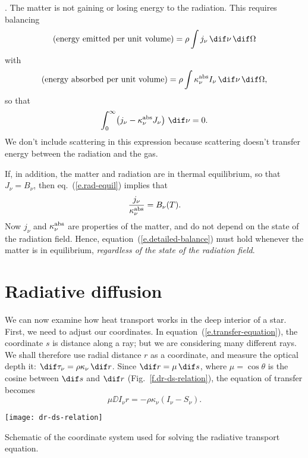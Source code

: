 . 
The matter is not gaining or losing energy to the radiation. This requires balancing
\[ \left(\textrm{energy emitted per unit volume}\right) = \rho\int j_{\nu}\,\dif\nu\,\dif\Omega\] 
with
\[ \left(\textrm{energy absorbed per unit volume}\right) = \rho\int \kapabs I_{\nu}\,\dif\nu\,\dif\Omega,\]
so that
\begin{equation}\label{e.rad-equil}
\int_{0}^{\infty}\! \left(j_{\nu} - \kapabs J_{\nu}\right)\,\dif\nu = 0.
\end{equation}
We don't include scattering in this expression because scattering doesn't transfer energy between the radiation and the gas.

If, in addition, the matter and radiation are in thermal equilibrium, so that $J_{\nu} = B_{\nu}$, then eq.~(\ref{e.rad-equil}) implies that
\begin{equation}\label{e.detailed-balance}
\frac{j_{\nu}}{\kappa_\nu^{\mathrm{abs}}} = B_{\nu}(T).
\end{equation}
Now $j_{\nu}$ and $\kappa_\nu^{\mathrm{abs}}$ are properties of the matter, and do not depend on the state of the radiation field. Hence, equation~(\ref{e.detailed-balance}) must hold whenever the matter is in equilibrium, \emph{regardless of the state of the radiation field}.

\section{Radiative diffusion}

We can now examine how heat transport works in the deep interior of a star. First, we need to adjust our coordinates. In equation~(\ref{e.transfer-equation}), the coordinate $s$ is distance along a ray; but we are considering many different rays. We shall therefore use radial distance $r$ as a coordinate, and measure the optical depth it: $\dif\tau_{\nu} = \rho\kappa_{\nu}\,\dif r$. 
Since $\dif r = \mu\,\dif s$, where $\mu=\cos\theta$ is the cosine between $\dif s$ and $\dif r$ (Fig.~\ref{f.dr-ds-relation}), the equation of transfer becomes
\begin{equation}
\mu\DD{I_{\nu}}{r} = -\rho\kappa_{\nu}\left(I_{\nu} - S_{\nu}\right).
\end{equation}
\begin{marginfigure}
\texttt{[image: dr-ds-relation]}
\caption[Coordinates for radiative transport equation]{\label{f.dr-ds-relation} Schematic of the coordinate system used for solving the radiative transport equation.}
\end{marginfigure}

